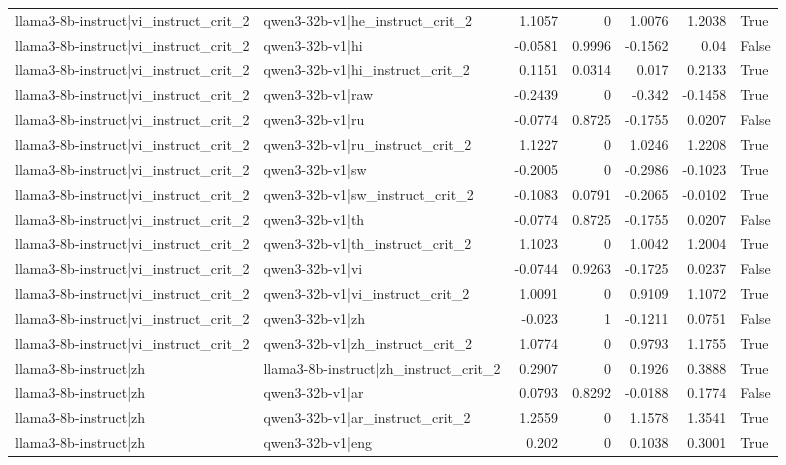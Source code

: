 \begin{table}
\begin{tabular}{l l r r r r l}
llama3-8b-instruct|vi_instruct_crit_2 & qwen3-32b-v1|he_instruct_crit_2 & 1.1057 & 0 & 1.0076 & 1.2038 & True \\
llama3-8b-instruct|vi_instruct_crit_2 & qwen3-32b-v1|hi & -0.0581 & 0.9996 & -0.1562 & 0.04 & False \\
llama3-8b-instruct|vi_instruct_crit_2 & qwen3-32b-v1|hi_instruct_crit_2 & 0.1151 & 0.0314 & 0.017 & 0.2133 & True \\
llama3-8b-instruct|vi_instruct_crit_2 & qwen3-32b-v1|raw & -0.2439 & 0 & -0.342 & -0.1458 & True \\
llama3-8b-instruct|vi_instruct_crit_2 & qwen3-32b-v1|ru & -0.0774 & 0.8725 & -0.1755 & 0.0207 & False \\
llama3-8b-instruct|vi_instruct_crit_2 & qwen3-32b-v1|ru_instruct_crit_2 & 1.1227 & 0 & 1.0246 & 1.2208 & True \\
llama3-8b-instruct|vi_instruct_crit_2 & qwen3-32b-v1|sw & -0.2005 & 0 & -0.2986 & -0.1023 & True \\
llama3-8b-instruct|vi_instruct_crit_2 & qwen3-32b-v1|sw_instruct_crit_2 & -0.1083 & 0.0791 & -0.2065 & -0.0102 & True \\
llama3-8b-instruct|vi_instruct_crit_2 & qwen3-32b-v1|th & -0.0774 & 0.8725 & -0.1755 & 0.0207 & False \\
llama3-8b-instruct|vi_instruct_crit_2 & qwen3-32b-v1|th_instruct_crit_2 & 1.1023 & 0 & 1.0042 & 1.2004 & True \\
llama3-8b-instruct|vi_instruct_crit_2 & qwen3-32b-v1|vi & -0.0744 & 0.9263 & -0.1725 & 0.0237 & False \\
llama3-8b-instruct|vi_instruct_crit_2 & qwen3-32b-v1|vi_instruct_crit_2 & 1.0091 & 0 & 0.9109 & 1.1072 & True \\
llama3-8b-instruct|vi_instruct_crit_2 & qwen3-32b-v1|zh & -0.023 & 1 & -0.1211 & 0.0751 & False \\
llama3-8b-instruct|vi_instruct_crit_2 & qwen3-32b-v1|zh_instruct_crit_2 & 1.0774 & 0 & 0.9793 & 1.1755 & True \\
llama3-8b-instruct|zh & llama3-8b-instruct|zh_instruct_crit_2 & 0.2907 & 0 & 0.1926 & 0.3888 & True \\
llama3-8b-instruct|zh & qwen3-32b-v1|ar & 0.0793 & 0.8292 & -0.0188 & 0.1774 & False \\
llama3-8b-instruct|zh & qwen3-32b-v1|ar_instruct_crit_2 & 1.2559 & 0 & 1.1578 & 1.3541 & True \\
llama3-8b-instruct|zh & qwen3-32b-v1|eng & 0.202 & 0 & 0.1038 & 0.3001 & True \\

\end{tabular}
\end{table}
